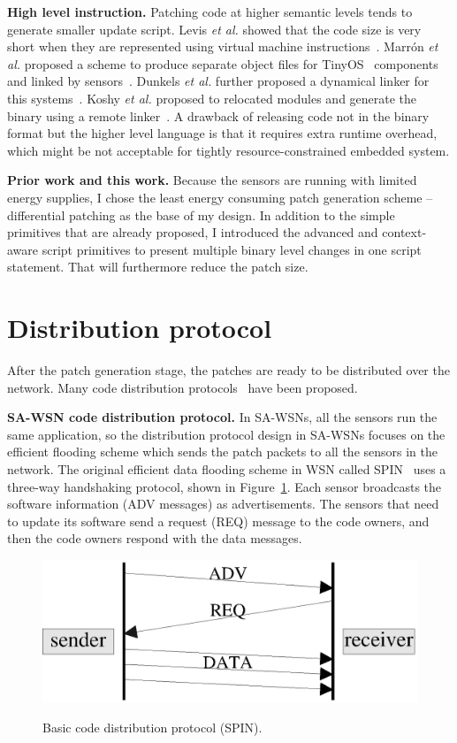 \textbf{High level instruction.}
Patching code at higher semantic levels tends to generate smaller update script. Levis \textit{et al.} showed that the code size is very short when they are represented using virtual machine instructions~\cite{mate}. Marr\'on \textit{et al.} proposed a scheme to produce separate object files for TinyOS~\cite{tinyos} components and linked by sensors~\cite{related:flexcup}. Dunkels \textit{et al.} further proposed a dynamical linker for this systems~\cite{related:dynamic1}. Koshy \textit{et al.} proposed to relocated modules and generate the binary using a remote linker~\cite{related:dynamic2}.
A drawback of releasing code not in the binary format but the higher level language is that it requires extra runtime overhead, which might be not acceptable for tightly resource-constrained embedded system.

\textbf{Prior work and this work.}
Because the sensors are running with limited energy supplies, I chose the least energy consuming patch generation scheme -- differential patching as the base of my design.
In addition to the simple primitives that are already proposed, I introduced the advanced and context-aware script primitives to 
present multiple binary level changes in one script statement.
That will furthermore reduce the patch size.

\section{Distribution protocol}

After the patch generation stage, the patches are ready to be distributed over the network. Many code distribution protocols~\cite{spin,trickle,melete,deluge,mnp} have been proposed.

\textbf{SA-WSN code distribution protocol.}
In SA-WSNs, all the sensors run the same application, so the distribution protocol design in SA-WSNs focuses on the efficient flooding scheme which sends the patch packets to all the sensors in the network. The original efficient data flooding scheme in WSN called SPIN~\cite{spin} uses a three-way handshaking protocol, shown in Figure~\ref{fig:spin}. Each sensor broadcasts the software information (ADV messages) as advertisements. The sensors that need to update its software send a request (REQ) message to the code owners, and then the code owners respond with the data messages.

\begin{figure}[htbp]
	\centering
		\includegraphics[scale=0.45]{figures/basic-protocol.eps}
	\label{fig:spin}
	\caption{Basic code distribution protocol (SPIN).}
\end{figure}

